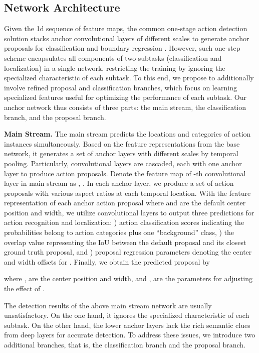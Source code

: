 \documentclass{article}
\begin{document}
\subsection{Network Architecture}
Given the 1d sequence of feature maps, the common one-stage action detection solution stacks  anchor convolutional layers of different scales to generate anchor proposals for classification and boundary regression \cite{lin2017single}. However, such one-step scheme encapsulates all components of two subtasks (classification and localization) in a single network, restricting the training by ignoring the specialized characteristic of each subtask. 
To this end, we propose to additionally involve refined proposal and classification branches, which focus on learning specialized features useful for optimizing the performance of each subtask.
Our anchor network thus consists of three parts: the main stream, the classification branch, and the proposal branch.


\textbf{Main Stream.}
The main stream predicts the locations and categories of action instances simultaneously. Based on the feature representations from the base network, it generates a set of anchor layers with different scales by temporal pooling.
Particularly,  convolutional layers are cascaded, each with one anchor layer to produce action proposals. Denote the feature map of -th convolutional layer in main stream as , .
In each anchor layer, we produce a set of action proposals with various aspect ratios at each temporal location.
With the feature representation of each anchor action proposal  where  and  are the default center position and width, we utilize  convolutional layers to output three predictions for action recognition and localization: ) action classification scores  indicating the probabilities belong to  action categories plus one ``background'' class, ) the overlap value  representing the IoU between the default proposal  and its closest ground truth proposal, and ) proposal regression parameters  denoting the center and width offsets for .
Finally, we obtain the predicted proposal  by

where ,  are the center position and width, and ,  are the parameters for adjusting the effect of .

The detection results of the above main stream network are usually unsatisfactory.
On the one hand, it ignores the specialized characteristic of each subtask.
On the other hand, the lower anchor layers lack the rich semantic clues from deep layers for accurate detection.
To address these issues, we introduce two additional branches, that is, the classification branch and the proposal branch.
\end{document}
